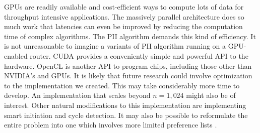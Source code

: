 \documentclass[journal]{IEEEtran}
\begin{document}
GPUs are readily available and cost-efficient ways to compute lots of data for
throughput intensive applications.  The massively parallel architecture does so
much work that latencies can even be improved by reducing the computation time
of complex algorithms. The PII algorithm demands this kind of efficiency.  It
is not unreasonable to imagine a variants of PII algorithm running on a
GPU-enabled router.  CUDA provides a conveniently simple and powerful API to
the hardware.  OpenCL is another API to program chips, including those other
than NVIDIA's and GPUs.  It is likely that future research could involve
optimization to the implementation we created.  This may take considerably more
time to develop. An implementation that scales beyond $n=1,024$ might also be
of interest.  Other natural modifications to this implementation are
implementing smart initiation and cycle detection. It may also be possible to
reformulate the entire problem into one which involves more limited preference
lists \cite{white-lu}.






%


\end{document}
